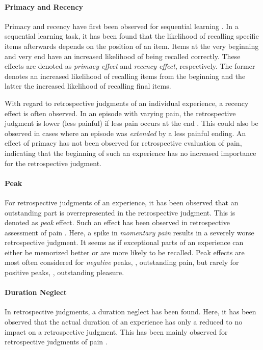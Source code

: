 \paragraph*{Primacy and Recency}
Primacy and recency have first been observed for sequential learning \citep[][]{murdock_jr._serial_1962}.
In a sequential learning task, it has been found that the likelihood of recalling specific items afterwards depends on the position of an item.
Items at the very beginning and very end have an increased likelihood of being recalled correctly.
These effects are denoted as \emph{primacy effect} and \emph{recency effect}, respectively.
The former denotes an increased likelihood of recalling items from the beginning and the latter the increased likelihood of recalling final items.

With regard to retrospective judgments of an individual experience, a recency effect is often observed.
In an episode with varying pain, the retrospective judgment is lower (less painful) if less pain occurs at the end \citep[][]{kahneman_when_1993, redelmeier_patients_1996}.
This could also be observed in cases where an episode was \emph{extended} by a less painful ending.
An effect of primacy has not been observed for retrospective evaluation of pain, indicating that the beginning of such an experience has no increased importance for the retrospective judgment.

\paragraph*{Peak}
For retrospective judgments of an experience, it has been observed that an outstanding part is overrepresented in the retrospective judgment.
This is denoted as \emph{peak} effect.
Such an effect has been observed in retrospective assessment of pain \citep[][]{kahneman_when_1993, redelmeier_patients_1996}.
Here, a spike in \emph{momentary pain} results in a severely worse retrospective judgment.
It seems as if exceptional parts of an experience can either be memorized better or are more likely to be recalled.
Peak effects are most often considered for \emph{negative} peaks, \eg, outstanding pain, but rarely for positive peaks, \eg, outstanding pleasure.

\paragraph*{Duration Neglect}
In retrospective judgments, a duration neglect has been found.
Here, it has been observed that the actual duration of an experience has only a reduced to no impact on a retrospective judgment.
This has been mainly observed for retrospective judgments of pain \citep[][]{fredrickson_duration_1993, ariely_combining_1998}.

